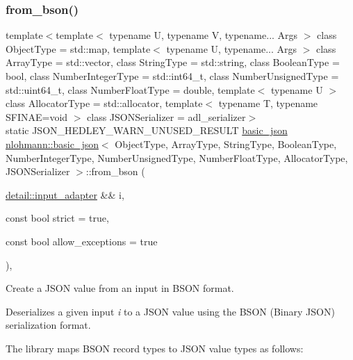 \subsubsection{\texorpdfstring{from\+\_\+bson()}{from\_bson()}\hspace{0.1cm}{\footnotesize\ttfamily [1/2]}}
{\footnotesize\ttfamily template$<$template$<$ typename U, typename V, typename... Args $>$ class Object\+Type = std\+::map, template$<$ typename U, typename... Args $>$ class Array\+Type = std\+::vector, class String\+Type  = std\+::string, class Boolean\+Type  = bool, class Number\+Integer\+Type  = std\+::int64\+\_\+t, class Number\+Unsigned\+Type  = std\+::uint64\+\_\+t, class Number\+Float\+Type  = double, template$<$ typename U $>$ class Allocator\+Type = std\+::allocator, template$<$ typename T, typename S\+F\+I\+N\+A\+E=void $>$ class J\+S\+O\+N\+Serializer = adl\+\_\+serializer$>$ \\
static J\+S\+O\+N\+\_\+\+H\+E\+D\+L\+E\+Y\+\_\+\+W\+A\+R\+N\+\_\+\+U\+N\+U\+S\+E\+D\+\_\+\+R\+E\+S\+U\+LT \mbox{\hyperlink{classnlohmann_1_1basic__json}{basic\+\_\+json}} \mbox{\hyperlink{classnlohmann_1_1basic__json}{nlohmann\+::basic\+\_\+json}}$<$ Object\+Type, Array\+Type, String\+Type, Boolean\+Type, Number\+Integer\+Type, Number\+Unsigned\+Type, Number\+Float\+Type, Allocator\+Type, J\+S\+O\+N\+Serializer $>$\+::from\+\_\+bson (\begin{DoxyParamCaption}\item[{\mbox{\hyperlink{classnlohmann_1_1detail_1_1input__adapter}{detail\+::input\+\_\+adapter}} \&\&}]{i,  }\item[{const bool}]{strict = {\ttfamily true},  }\item[{const bool}]{allow\+\_\+exceptions = {\ttfamily true} }\end{DoxyParamCaption})\hspace{0.3cm}{\ttfamily [inline]}, {\ttfamily [static]}}



Create a J\+S\+ON value from an input in B\+S\+ON format. 

Deserializes a given input {\itshape i} to a J\+S\+ON value using the B\+S\+ON (Binary J\+S\+ON) serialization format.

The library maps B\+S\+ON record types to J\+S\+ON value types as follows\+:

